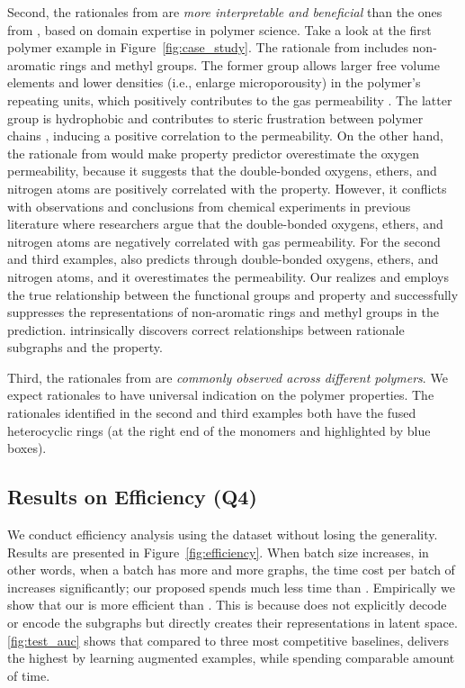 \documentclass[sigconf]{acmart}
\begin{document}
Second, the rationales from \method are \emph{more interpretable and beneficial} than the ones from \dir, based on domain expertise in polymer science.
Take a look at the first polymer example in Figure~\ref{fig:case_study}.
The rationale from \method includes non-aromatic rings and methyl groups.
The former group allows larger free volume elements and lower densities (i.e., enlarge microporousity) in the polymer's repeating units, which positively contributes to the gas permeability \cite{sanders2013energy,yang2021discovery}.
The latter group is hydrophobic and contributes to steric frustration between polymer chains \cite{yang2021discovery}, inducing a positive correlation to the permeability.
On the other hand, the rationale from \dir would make property predictor overestimate the oxygen permeability, because it suggests that the double-bonded oxygens, ethers, and nitrogen atoms are positively correlated with the property.
However, it conflicts with observations and conclusions from chemical experiments in previous literature \cite{yang2021discovery} where researchers argue that the double-bonded oxygens, ethers, and nitrogen atoms are negatively correlated with gas permeability.
For the second and third examples, \dir also predicts through double-bonded oxygens, ethers, and nitrogen atoms, and it overestimates the permeability.
Our \method realizes and employs the true relationship between the functional groups and property and successfully suppresses the representations of non-aromatic rings and methyl groups in the prediction.
\method intrinsically discovers correct relationships between rationale subgraphs and the property.

Third, the rationales from \method are \emph{commonly observed across different polymers}.
We expect rationales to have universal indication on the polymer properties.
The rationales identified in the second and third examples both have the fused heterocyclic rings (at the right end of the monomers and highlighted by blue boxes).

\subsection{Results on Efficiency (Q4)}\label{sec:q4_efficiency}
We conduct efficiency analysis using the \hiv dataset without losing the generality. Results are presented in Figure~\ref{fig:efficiency}. When batch size increases, in other words, when a batch has more and more graphs, the time cost per batch of \dir increases significantly; our proposed \method spends much less time than \dir. Empirically we show that our \method is more efficient than \dir. This is because \method does not explicitly decode or encode the subgraphs but directly creates their representations in latent space.
\cref{fig:test_auc} shows that compared to three most competitive baselines, \method delivers the highest \classifyAUC by learning augmented examples, while spending comparable amount of time. 
\end{document}
